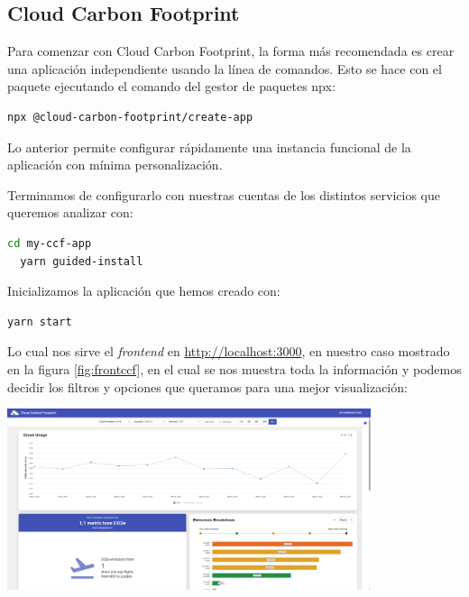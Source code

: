 \documentclass[12pt,a4paper]{report}
\begin{document}
\subsection{Cloud Carbon Footprint}
Para comenzar con Cloud Carbon Footprint, la forma más recomendada es crear una
aplicación independiente usando la línea de comandos. Esto se hace con el
paquete ejecutando el comando del gestor de paquetes npx:

\begin{tcolorbox}[colback=codebackground, colframe=codeborder, boxrule=0.8pt, arc=0mm, boxsep=5pt, left=5pt, right=5pt, top=5pt, bottom=5pt]
  \begin{lstlisting}[language=bash]
  npx @cloud-carbon-footprint/create-app
  \end{lstlisting}
\end{tcolorbox}

Lo anterior permite configurar rápidamente una instancia funcional de la
aplicación con mínima personalización.

Terminamos de configurarlo con nuestras cuentas de los distintos servicios que
queremos analizar con:

\begin{tcolorbox}[colback=codebackground, colframe=codeborder, boxrule=0.8pt, arc=0mm, boxsep=5pt, left=5pt, right=5pt, top=5pt, bottom=5pt]
  \begin{lstlisting}[language=bash]
  cd my-ccf-app
  yarn guided-install
  \end{lstlisting}
\end{tcolorbox}

Inicializamos la aplicación que hemos creado con:

\begin{tcolorbox}[colback=codebackground, colframe=codeborder, boxrule=0.8pt, arc=0mm, boxsep=5pt, left=5pt, right=5pt, top=5pt, bottom=5pt]
  \begin{lstlisting}[language=bash]
  yarn start
  \end{lstlisting}
\end{tcolorbox}

Lo cual nos sirve el \textit{frontend} en
\href{http://localhost:3000}{http://localhost:3000}, en nuestro caso mostrado en la figura \ref{fig:frontccf}, en el cual se nos muestra
toda la información y podemos decidir los filtros y opciones que queramos para
una mejor visualización:

\begin{center}
  \includegraphics[width=0.8\textwidth]{imagenes/CCF_1.png}
  \label{fig:frontccf}
\end{center}
\end{document}
